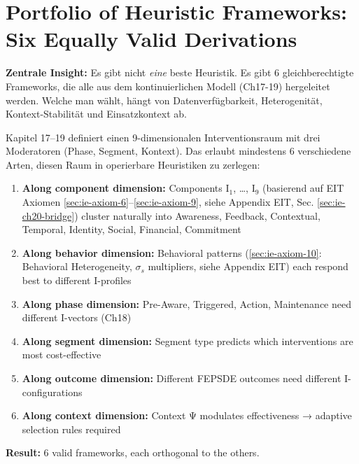 \section{Portfolio of Heuristic Frameworks: Six Equally Valid Derivations}
\label{sec:20-frameworks}

\textbf{Zentrale Insight:} Es gibt nicht \textit{eine} beste Heuristik. Es gibt 6 gleichberechtigte Frameworks, die alle aus dem kontinuierlichen Modell (Ch17-19) hergeleitet werden. Welche man wählt, hängt von Datenverfügbarkeit, Heterogenität, Kontext-Stabilität und Einsatzkontext ab.

\begin{tcolorbox}[colback=purple!5!white, colframe=purple!75!black, title=\textbf{Why 6 Frameworks?}]

Kapitel 17--19 definiert einen 9-dimensionalen Interventionsraum mit drei Moderatoren (Phase, Segment, Kontext). Das erlaubt mindestens 6 verschiedene Arten, diesen Raum in operierbare Heuristiken zu zerlegen:

\begin{enumerate}
\item \textbf{Along component dimension:} Components I$_1$, \ldots, I$_9$ (basierend auf EIT Axiomen \ref{sec:ie-axiom-6}--\ref{sec:ie-axiom-9}, siehe Appendix EIT, Sec. \ref{sec:ie-ch20-bridge}) cluster naturally into Awareness, Feedback, Contextual, Temporal, Identity, Social, Financial, Commitment
\item \textbf{Along behavior dimension:} Behavioral patterns (\ref{sec:ie-axiom-10}: Behavioral Heterogeneity, $\sigma_s$ multipliers, siehe Appendix EIT) each respond best to different I-profiles
\item \textbf{Along phase dimension:} Pre-Aware, Triggered, Action, Maintenance need different I-vectors (Ch18)
\item \textbf{Along segment dimension:} Segment type predicts which interventions are most cost-effective
\item \textbf{Along outcome dimension:} Different FEPSDE outcomes need different I-configurations
\item \textbf{Along context dimension:} Context Ψ modulates effectiveness → adaptive selection rules required
\end{enumerate}

\textbf{Result:} 6 valid frameworks, each orthogonal to the others.

\end{tcolorbox}

